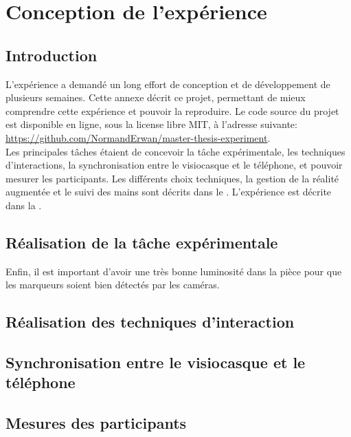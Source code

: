 \chapter{Conception de l'expérience}
\label{annex:experiment_code}

\section{Introduction}
L'expérience a demandé un long effort de conception et de développement de plusieurs semaines. Cette annexe décrit ce projet, permettant de mieux comprendre cette expérience et pouvoir la reproduire. Le code source du projet est disponible en ligne, sous la license libre MIT, à l'adresse suivante: \url{https://github.com/NormandErwan/master-thesis-experiment}.\\
Les principales tâches étaient de concevoir la tâche expérimentale, les techniques d'interactions, la synchronisation entre le visiocasque et le téléphone, et pouvoir mesurer les participants. Les différents choix techniques, la gestion de la réalité augmentée et le suivi des mains sont décrits dans le . L'expérience est décrite dans la .

\section{Réalisation de la tâche expérimentale}

Enfin, il est important d'avoir une très bonne luminosité dans la pièce pour que les marqueurs soient bien détectés par les caméras.

\section{Réalisation des techniques d'interaction}

\section{Synchronisation entre le visiocasque et le téléphone}

\section{Mesures des participants}